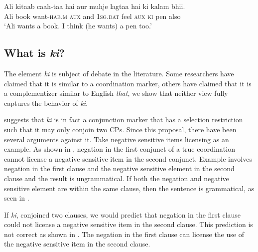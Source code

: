 \documentclass[output=paper]{langscibook}
\begin{document}
\ea 
    \gll Ali kitaab caah-taa hai aur muhje lagtaa hai ki kalam bhii.\\
    Ali book want-\textsc{hab.m} \textsc{aux} and \textsc{1sg.dat} feel \textsc{aux} \textsc{ki} pen also\\
    \glt `Ali wants a book. I think (he wants) a pen too.'
\z 
\subsection{What is \emph{ki}?}
\begin{sloppypar}
The element \emph{ki} is subject of debate in the literature. Some researchers have claimed that it is similar to a coordination marker, others have claimed that it is a complementizer similar to English \emph{that}, we show that neither view fully captures the behavior of \emph{ki}. 
\end{sloppypar}

\citet{dwivedi94} suggests that \emph{ki} is in fact a conjunction marker that has a selection restriction such that it may only conjoin two CPs. Since this proposal, there have been several arguments against it. Take negative sensitive items licensing as an example. As shown in , negation in the first conjunct of a true coordination cannot license a negative sensitive item in the second conjunct. Example  involves negation in the first clause and the negative sensitive element in the second clause and the result is ungrammatical. If both the negation and negative sensitive element are within the same clause, then the sentence is grammatical, as seen in .

\ea \label{maex21}
    \z 
\z 
If \emph{ki}, conjoined two clauses, we would predict that negation in the first clause could not license a negative sensitive item in the second clause. This prediction is not correct as shown in . The negation in the first clause can license the use of the negative sensitive item in the second clause.  
\end{document}
